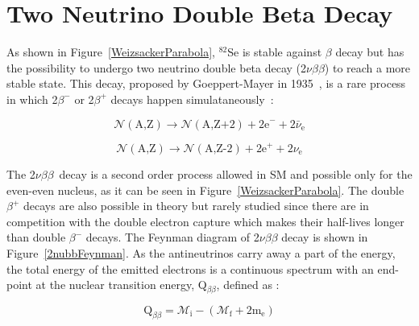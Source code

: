\documentclass[main.tex]{subfiles}
\begin{document}
\section{Two Neutrino Double Beta Decay}\label{sec:2NeutrinoDBD}


\NI As shown in Figure~\ref{WeizsackerParabola}, $^{\text{82}}$Se is stable against $\beta$ decay but has the possibility to undergo two neutrino double beta decay (2$\nu\beta\beta$) to reach a more stable state. This decay, proposed by Goeppert-Mayer in 1935~\cite{GoeppertMayerDoubleBetaDecay}, is a rare process in which 2$\beta^{-}$ or 2$\beta^{+}$ decays happen simulataneously~: 


\begin{equation}
\mathcal{N} (\text{A,Z}) \rightarrow \mathcal{N} (\text{A,Z+2}) + \text{2e}^- + \text{2}\bar{\nu}_{\text{e}} 
\end{equation}

\begin{equation}
\mathcal{N} (\text{A,Z}) \rightarrow \mathcal{N} (\text{A,Z-2}) + \text{2e}^+ + \text{2}\nu_{\text{e}} 
\end{equation}


\NI The 2$\nu\beta\beta$~decay is a second order process allowed in SM and possible only for the even-even nucleus, as it can be seen in Figure~\ref{WeizsackerParabola}. The double $\beta^{+}$ decays are also possible in theory but rarely studied since there are in competition with the double electron capture which makes their half-lives longer than double $\beta^{-}$ decays. The Feynman diagram of 2$\nu\beta\beta$ decay is shown in Figure~\ref{2nubbFeynman}. As the antineutrinos carry away a part of the energy, the total energy of the emitted electrons is a continuous spectrum with an end-point at the nuclear transition energy, Q$_{\beta\beta}$, defined as :


\begin{equation}
\text{Q}_{\beta\beta} = \mathcal{M}_\text{i} - (\mathcal{M}_\text{f} + \text{2m}_\text{e})
\end{equation}



\FloatBarrier
\end{document}
